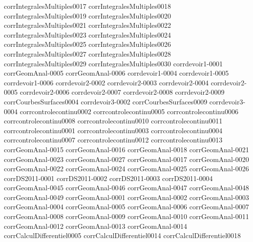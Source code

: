 {corrIntegralesMultiples0017}
{corrIntegralesMultiples0018}
{corrIntegralesMultiples0019}
{corrIntegralesMultiples0020}
{corrIntegralesMultiples0021}
{corrIntegralesMultiples0022}
{corrIntegralesMultiples0023}
{corrIntegralesMultiples0024}
{corrIntegralesMultiples0025}
{corrIntegralesMultiples0026}
{corrIntegralesMultiples0027}
{corrIntegralesMultiples0028}
{corrIntegralesMultiples0029}
{corrIntegralesMultiples0030}
{corrdevoir1-0001}
{corrGeomAnal-0005}
{corrGeomAnal-0006}
{corrdevoir1-0004}
{corrdevoir1-0005}
{corrdevoir1-0006}
{corrdevoir2-0002}
{corrdevoir2-0003}
{corrdevoir2-0004}
{corrdevoir2-0005}
{corrdevoir2-0006}
{corrdevoir2-0007}
{corrdevoir2-0008}
{corrdevoir2-0009}
{corrCourbesSurfaces0004}
{corrdevoir3-0002}
{corrCourbesSurfaces0009}
{corrdevoir3-0004}
{corrcontrolecontinu0002}
{corrcontrolecontinu0005}
{corrcontrolecontinu0006}
{corrcontrolecontinu0008}
{corrcontrolecontinu0010}
{corrcontrolecontinu0011}
{corrcontrolecontinu0001}
{corrcontrolecontinu0003}
{corrcontrolecontinu0004}
{corrcontrolecontinu0007}
{corrcontrolecontinu0012}
{corrcontrolecontinu0013}
{corrGeomAnal-0015}
{corrGeomAnal-0016}
{corrGeomAnal-0018}
{corrGeomAnal-0021}
{corrGeomAnal-0023}
{corrGeomAnal-0027}
{corrGeomAnal-0017}
{corrGeomAnal-0020}
{corrGeomAnal-0022}
{corrGeomAnal-0024}
{corrGeomAnal-0025}
{corrGeomAnal-0026}
{corrDS2011-0001}
{corrDS2011-0002}
{corrDS2011-0003}
{corrDS2011-0004}
{corrGeomAnal-0045}
{corrGeomAnal-0046}
{corrGeomAnal-0047}
{corrGeomAnal-0048}
{corrGeomAnal-0049}
{corrGeomAnal-0001}
{corrGeomAnal-0002}
{corrGeomAnal-0003}
{corrGeomAnal-0004}
{corrGeomAnal-0005}
{corrGeomAnal-0006}
{corrGeomAnal-0007}
{corrGeomAnal-0008}
{corrGeomAnal-0009}
{corrGeomAnal-0010}
{corrGeomAnal-0011}
{corrGeomAnal-0012}
{corrGeomAnal-0013}
{corrGeomAnal-0014}
{corrCalculDifferentiel0005}
{corrCalculDifferentiel0014}
{corrCalculDifferentiel0018}
